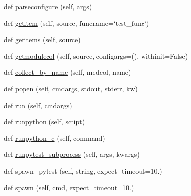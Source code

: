 \begin{DoxyCompactItemize}
\item 
def \hyperlink{class__pytest_1_1pytester_1_1_testdir_a487dc4e180e9b1481c792f51da389fc5}{parseconfigure} (self, args)
\item 
def \hyperlink{class__pytest_1_1pytester_1_1_testdir_a5ab8fa8e29ef69d0c8f9232b00790097}{getitem} (self, source, funcname=\char`\"{}test\+\_\+func\char`\"{})
\item 
def \hyperlink{class__pytest_1_1pytester_1_1_testdir_a553d8582c95aea7218dc719023e43214}{getitems} (self, source)
\item 
def \hyperlink{class__pytest_1_1pytester_1_1_testdir_ad1f5a7300fc126a2e434f2b3cba4dcdc}{getmodulecol} (self, source, configargs=(), withinit=False)
\item 
def \hyperlink{class__pytest_1_1pytester_1_1_testdir_a9679d38d4e3fb6ce44f5ddc45547a784}{collect\+\_\+by\+\_\+name} (self, modcol, name)
\item 
def \hyperlink{class__pytest_1_1pytester_1_1_testdir_a415eccf041216a08c27c8e32b1185084}{popen} (self, cmdargs, stdout, stderr, kw)
\item 
def \hyperlink{class__pytest_1_1pytester_1_1_testdir_af7b50df501fe7b4775e0ab1a47648d87}{run} (self, cmdargs)
\item 
def \hyperlink{class__pytest_1_1pytester_1_1_testdir_a2dff2082ac09b7a20411dd8e7e3422b6}{runpython} (self, script)
\item 
def \hyperlink{class__pytest_1_1pytester_1_1_testdir_ac509aea7fa82c024a5a23e9caef87c2c}{runpython\+\_\+c} (self, command)
\item 
def \hyperlink{class__pytest_1_1pytester_1_1_testdir_ac919df5fd43e3a87ef9ddc9ec6ef94c1}{runpytest\+\_\+subprocess} (self, args, kwargs)
\item 
def \hyperlink{class__pytest_1_1pytester_1_1_testdir_adb5e39574c3a4cbd3b600e758097f7e0}{spawn\+\_\+pytest} (self, string, expect\+\_\+timeout=10.)
\item 
def \hyperlink{class__pytest_1_1pytester_1_1_testdir_a84e7360700c799b35f2b3d783331290e}{spawn} (self, cmd, expect\+\_\+timeout=10.)
\end{DoxyCompactItemize}
